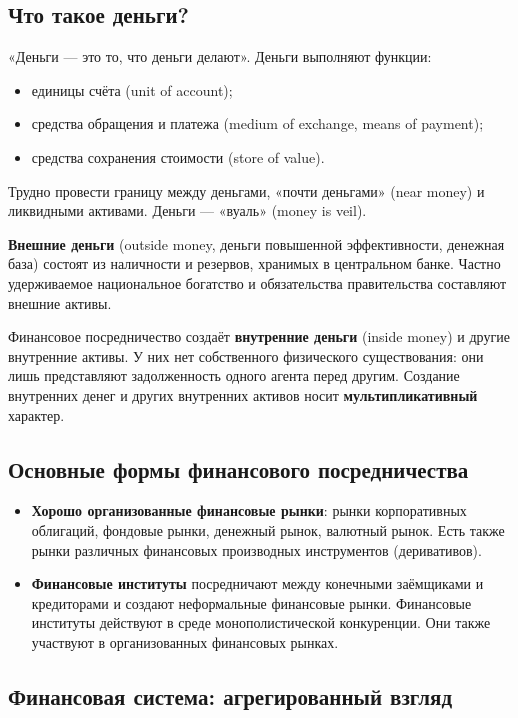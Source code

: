 \documentclass[10pt,a4paper]{article}
\begin{document}
\subsection{Что такое деньги?}

«Деньги — это то, что деньги делают». Деньги выполняют функции:
\begin{itemize}[leftmargin=1.3em]
\item единицы счёта (unit of account);
\item средства обращения и платежа (medium of exchange, means of payment);
\item средства сохранения стоимости (store of value).
\end{itemize}
Трудно провести границу между деньгами, «почти деньгами» (near money) и ликвидными активами. Деньги — «вуаль» (money is veil).

\textbf{Внешние деньги} (outside money, деньги повышенной эффективности, денежная база) состоят из наличности и резервов, хранимых в центральном банке. Частно удерживаемое национальное богатство и обязательства правительства составляют внешние активы.

Финансовое посредничество создаёт \textbf{внутренние деньги} (inside money) и другие внутренние активы. У них нет собственного физического существования: они лишь представляют задолженность одного агента перед другим. Создание внутренних денег и других внутренних активов носит \textbf{мультипликативный} характер.

\subsection{Основные формы финансового посредничества}

\begin{itemize}[leftmargin=1.3em]
\item \textbf{Хорошо организованные финансовые рынки}: рынки корпоративных облигаций, фондовые рынки, денежный рынок, валютный рынок. Есть также рынки различных финансовых производных инструментов (деривативов).
\item \textbf{Финансовые институты} посредничают между конечными заёмщиками и кредиторами и создают неформальные финансовые рынки. Финансовые институты действуют в среде монополистической конкуренции. Они также участвуют в организованных финансовых рынках.
\end{itemize}

\subsection{Финансовая система: агрегированный взгляд}
\end{document}
